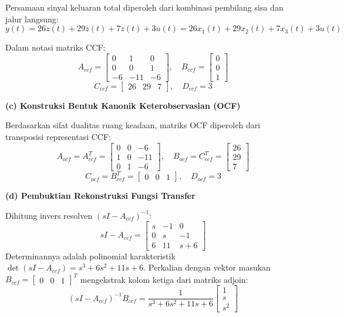 \documentclass[11pt,a4paper]{article}
\begin{document}
Persamaan sinyal keluaran total diperoleh dari kombinasi pembilang sisa dan jalur langsung:
$$y(t) = 26z(t) + 29\dot{z}(t) + 7\ddot{z}(t) + 3u(t) = 26x_1(t) + 29x_2(t) + 7x_3(t) + 3u(t)$$

Dalam notasi matriks CCF:
$$A_{ccf} = \begin{bmatrix} 0 & 1 & 0 \\ 0 & 0 & 1 \\ -6 & -11 & -6 \end{bmatrix}, \quad B_{ccf} = \begin{bmatrix} 0 \\ 0 \\ 1 \end{bmatrix}$$
$$C_{ccf} = \begin{bmatrix} 26 & 29 & 7 \end{bmatrix}, \quad D_{ccf} = 3$$

\textbf{(c) Konstruksi Bentuk Kanonik Keterobservasian (OCF)}

Berdasarkan sifat dualitas ruang keadaan, matriks OCF diperoleh dari transposisi representasi CCF:
$$A_{ocf} = A_{ccf}^T = \begin{bmatrix} 0 & 0 & -6 \\ 1 & 0 & -11 \\ 0 & 1 & -6 \end{bmatrix}, \quad B_{ocf} = C_{ccf}^T = \begin{bmatrix} 26 \\ 29 \\ 7 \end{bmatrix}$$
$$C_{ocf} = B_{ccf}^T = \begin{bmatrix} 0 & 0 & 1 \end{bmatrix}, \quad D_{ocf} = 3$$

\textbf{(d) Pembuktian Rekonstruksi Fungsi Transfer}

Dihitung invers resolven $(sI - A_{ccf})^{-1}$:
$$sI - A_{ccf} = \begin{bmatrix} s & -1 & 0 \\ 0 & s & -1 \\ 6 & 11 & s+6 \end{bmatrix}$$
Determinannya adalah polinomial karakteristik $\det(sI - A_{ccf}) = s^3 + 6s^2 + 11s + 6$.
Perkalian dengan vektor masukan $B_{ccf} = \begin{bmatrix} 0 & 0 & 1 \end{bmatrix}^T$ mengekstrak kolom ketiga dari matriks adjoin:
$$(sI - A_{ccf})^{-1} B_{ccf} = \frac{1}{s^3 + 6s^2 + 11s + 6} \begin{bmatrix} 1 \\ s \\ s^2 \end{bmatrix}$$
\end{document}
